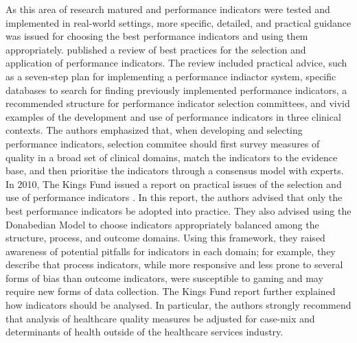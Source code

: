 \documentclass[12pt]{article}
\begin{document}
As this area of research matured and performance indicators were tested and implemented in real-world settings, more specific, detailed, and practical guidance was issued for choosing the best performance indicators and using them appropriately. \citet{wollersheimClinicalIndicatorsDevelopment2007} published a review of best practices for the selection and application of performance indicators. The review included practical advice, such as a seven-step plan for implementing a performance indiactor system, specific databases to search for finding previously implemented performance indicators, a recommended structure for performance indicator selection committees, and vivid examples of the development and use of performance indicators in three clinical contexts. The authors emphasized that, when developing and selecting performance indicators, selection commitee should first survey measures of quality in a broad set of clinical domains, match the indicators to the evidence base, and then prioritise the indicators through a consensus model with experts. In 2010, The Kings Fund issued a report on practical issues of the selection and use of performance indicators \citep{raleighGettingMeasureQuality2010}. In this report, the authors advised that only the best performance indicators be adopted into practice. They also advised using the Donabedian Model \citep{donabedianExplorationsQualityAssessment1980} to choose indicators appropriately balanced among the structure, process, and outcome domains. Using this framework, they raised awareness of potential pitfalls for indicators in each domain; for example, they describe that process indicators, while more responsive and less prone to several forms of bias than outcome indicators, were susceptible to gaming and may require new forms of data collection. The Kings Fund report further explained how indicators should be analysed. In particular, the authors strongly recommend that analysis of healthcare quality measures be adjusted for case-mix and determinants of health outside of the healthcare services industry.
\end{document}
